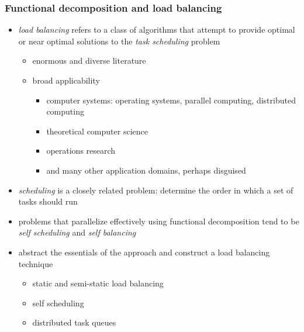 \begin{frame}[fragile]
%
  \frametitle{Functional decomposition and load balancing}
%
  \begin{itemize}
%
  \item {\em load balancing} refers to a class of algorithms that attempt to provide optimal or
    near optimal solutions to the {\em task scheduling} problem
    \begin{itemize}
    \item enormous and diverse literature
    \item broad applicability
      \begin{itemize}
      \item computer systems: operating systems, parallel computing, distributed computing
      \item theoretical computer science
      \item operations research
      \item and many other application domains, perhaps disguised
      \end{itemize}
    \end{itemize}
%
  \item {\em scheduling} is a closely related problem: determine the order in which a set
    of tasks should run
%
  \item problems that parallelize effectively using functional decomposition tend to be {\em
      self scheduling} and {\em self balancing}
%
  \item abstract the essentials of the approach and construct a load balancing technique
    \begin{itemize}
    \item static and semi-static load balancing
    \item self scheduling
    \item distributed task queues
    \end{itemize}
%
  \end{itemize}
%
\end{frame}

